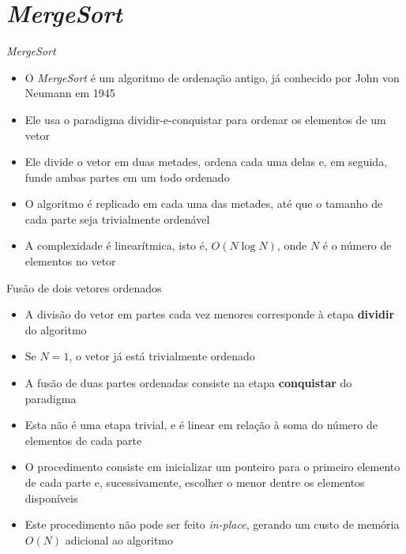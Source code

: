 \section{\it MergeSort}

\begin{frame}[fragile]{\it MergeSort}

    \begin{itemize}
        \item O \textit{MergeSort} é um algoritmo de ordenação antigo, já conhecido por
            John von Neumann em 1945

        \item Ele usa o paradigma dividir-e-conquistar para ordenar os elementos de um
            vetor

        \item Ele divide o vetor em duas metades, ordena cada uma delas e, em seguida,
           funde ambas partes em um todo ordenado

        \item O algoritmo é replicado em cada uma das metades, até que o tamanho de cada
            parte seja trivialmente ordenável 

        \item A complexidade é linearítmica, isto é, $O(N\log N)$, onde $N$ é o número de 
            elementos no vetor
    \end{itemize}

\end{frame}

\begin{frame}[fragile]{Fusão de dois vetores ordenados}

    \begin{itemize}
        \item A divisão do vetor em partes cada vez menores corresponde à etapa 
            \textbf{dividir} do algoritmo

        \item Se $N = 1$, o vetor já está trivialmente ordenado

        \item A fusão de duas partes ordenadas consiste na etapa \textbf{conquistar} do
            paradigma

        \item Esta não é uma etapa trivial, e é linear em relação à soma do número de elementos
            de cada parte

        \item O procedimento consiste em inicializar um ponteiro para o primeiro elemento de 
            cada parte e, sucessivamente, escolher o menor dentre os elementos disponíveis

        \item Este procedimento não pode ser feito \textit{in-place}, gerando um custo de
            memória $O(N)$ adicional ao algoritmo
    \end{itemize}

\end{frame}

